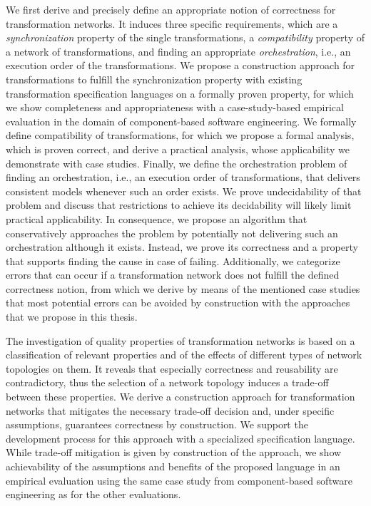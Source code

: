 We first derive and precisely define an appropriate notion of correctness for transformation networks.
It induces three specific requirements, which are a \emph{synchronization} property of the single transformations, a \emph{compatibility} property of a network of transformations, and finding an appropriate \emph{orchestration}, i.e., an execution order of the transformations.
We propose a construction approach for transformations to fulfill the synchronization property with existing transformation specification languages on a formally proven property, for which we show completeness and appropriateness with a case-study-based empirical evaluation in the domain of component-based software engineering.
We formally define compatibility of transformations, for which we propose a formal analysis, which is proven correct, and derive a practical analysis, whose applicability we demonstrate with case studies.
Finally, we define the orchestration problem of finding an orchestration, i.e., an execution order of transformations, that delivers consistent models whenever such an order exists.
We prove undecidability of that problem and discuss that restrictions to achieve its decidability will likely limit practical applicability.
In consequence, we propose an algorithm that conservatively approaches the problem by potentially not delivering such an orchestration although it exists.
Instead, we prove its correctness and a property that supports finding the cause in case of failing.
Additionally, we categorize errors that can occur if a transformation network does not fulfill the defined correctness notion, from which we derive by means of the mentioned case studies that most potential errors can be avoided by construction with the approaches that we propose in this thesis.

The investigation of quality properties of transformation networks is based on a classification of relevant properties and of the effects of different types of network topologies on them.
It reveals that especially correctness and reusability are contradictory, thus the selection of a network topology induces a trade-off between these properties.
We derive a construction approach for transformation networks that mitigates the necessary trade-off decision and, under specific assumptions, guarantees correctness by construction.
We support the development process for this approach with a specialized specification language.
While trade-off mitigation is given by construction of the approach, we show achievability of the assumptions and benefits of the proposed language in an empirical evaluation using the same case study from component-based software engineering as for the other evaluations.


